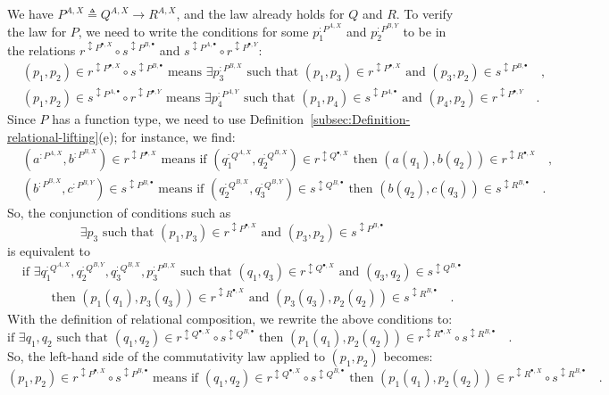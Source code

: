 We have $P^{A,X}\triangleq Q^{A,X}\rightarrow R^{A,X}$, and the law
already holds for $Q$ and $R$. To verify the law for $P$, we need
to write the conditions for some $p_{1}^{:P^{A,X}}$ and $p_{2}^{:P^{B,Y}}$
to be in the relations $r^{\updownarrow P^{\bullet,X}}\circ s^{\updownarrow P^{B,\bullet}}$
and $s^{\updownarrow P^{A,\bullet}}\circ r^{\updownarrow P^{\bullet,Y}}$:
\begin{align*}
 & (p_{1},p_{2})\in r^{\updownarrow P^{\bullet,X}}\circ s^{\updownarrow P^{B,\bullet}}\text{ means }\exists p_{3}^{:P^{B,X}}\text{ such that }(p_{1},p_{3})\in r^{\updownarrow P^{\bullet,X}}\text{ and }(p_{3},p_{2})\in s^{\updownarrow P^{B,\bullet}}\quad,\\
 & (p_{1},p_{2})\in s^{\updownarrow P^{A,\bullet}}\circ r^{\updownarrow P^{\bullet,Y}}\text{ means }\exists p_{4}^{:P^{A,Y}}\text{ such that }(p_{1},p_{4})\in s^{\updownarrow P^{A,\bullet}}\text{ and }(p_{4},p_{2})\in r^{\updownarrow P^{\bullet,Y}}\quad.
\end{align*}
 Since $P$ has a function type, we need to use Definition~\ref{subsec:Definition-relational-lifting}(e);
for instance, we find:
\begin{align*}
 & (a^{:P^{A,X}},b^{:P^{B,X}})\in r^{\updownarrow P^{\bullet,X}}\text{ means if }(q_{1}^{:Q^{A,X}},q_{2}^{:Q^{B,X}})\in r^{\updownarrow Q^{\bullet,X}}\text{ then }(a(q_{1}),b(q_{2}))\in r^{\updownarrow R^{\bullet,X}}\quad,\\
 & (b^{:P^{B,X}},c^{:P^{B,Y}})\in s^{\updownarrow P^{B,\bullet}}\text{ means if }(q_{2}^{:Q^{B,X}},q_{3}^{:Q^{B,Y}})\in s^{\updownarrow Q^{B,\bullet}}\text{ then }(b(q_{2}),c(q_{3}))\in s^{\updownarrow R^{B,\bullet}}\quad.
\end{align*}
So, the conjunction of conditions such as
\[
\exists p_{3}\text{ such that }(p_{1},p_{3})\in r^{\updownarrow P^{\bullet,X}}\text{ and }(p_{3},p_{2})\in s^{\updownarrow P^{B,\bullet}}
\]
is equivalent to
\begin{align*}
 & \text{if }\exists q_{1}^{:Q^{A,X}},q_{2}^{:Q^{B,Y}},q_{3}^{:Q^{B,X}},p_{3}^{:P^{B,X}}\text{ such that }(q_{1},q_{3})\in r^{\updownarrow Q^{\bullet,X}}\text{ and }(q_{3},q_{2})\in s^{\updownarrow Q^{B,\bullet}}\\
 & \quad\quad\text{ then }(p_{1}(q_{1}),p_{3}(q_{3}))\in r^{\updownarrow R^{\bullet,X}}\text{ and }(p_{3}(q_{3}),p_{2}(q_{2}))\in s^{\updownarrow R^{B,\bullet}}\quad.
\end{align*}
With the definition of relational composition, we rewrite the above
conditions to:
\[
\text{if }\exists q_{1},q_{2}\text{ such that }(q_{1},q_{2})\in r^{\updownarrow Q^{\bullet,X}}\circ s^{\updownarrow Q^{B,\bullet}}\text{ then }(p_{1}(q_{1}),p_{2}(q_{2}))\in r^{\updownarrow R^{\bullet,X}}\circ s^{\updownarrow R^{B,\bullet}}\quad.
\]
So, the left-hand side of the commutativity law applied to $\left(p_{1},p_{2}\right)$
becomes:
\[
(p_{1},p_{2})\in r^{\updownarrow P^{\bullet,X}}\circ s^{\updownarrow P^{B,\bullet}}\text{ means if }(q_{1},q_{2})\in r^{\updownarrow Q^{\bullet,X}}\circ s^{\updownarrow Q^{B,\bullet}}\text{ then }(p_{1}(q_{1}),p_{2}(q_{2}))\in r^{\updownarrow R^{\bullet,X}}\circ s^{\updownarrow R^{B,\bullet}}\quad.
\]

